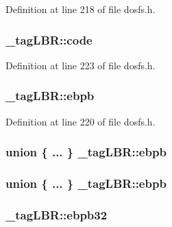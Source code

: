 Definition at line 218 of file dosfs.\-h.

\hypertarget{struct__tag_l_b_r_a9b37ce11cb14157ded631ff935d17c94}{
\subsubsection[{code}]{ \-\_\-tag\-L\-B\-R\-::code}}\label{struct__tag_l_b_r_a9b37ce11cb14157ded631ff935d17c94}


Definition at line 223 of file dosfs.\-h.

\hypertarget{struct__tag_l_b_r_a86d3372f818b659d2031640876756593}{
\subsubsection[{ebpb}]{ \-\_\-tag\-L\-B\-R\-::ebpb}}\label{struct__tag_l_b_r_a86d3372f818b659d2031640876756593}


Definition at line 220 of file dosfs.\-h.

\hypertarget{struct__tag_l_b_r_a36f500a686f857a8207e41763a4021c9}{
\subsubsection[{ebpb}]{\setlength{\rightskip}{0pt plus 5cm}union \{ ... \}   \-\_\-tag\-L\-B\-R\-::ebpb}}\label{struct__tag_l_b_r_a36f500a686f857a8207e41763a4021c9}
\hypertarget{struct__tag_l_b_r_a75f624210b6728a97ed21dcac0dfb4fd}{
\subsubsection[{ebpb}]{\setlength{\rightskip}{0pt plus 5cm}union \{ ... \}   \-\_\-tag\-L\-B\-R\-::ebpb}}\label{struct__tag_l_b_r_a75f624210b6728a97ed21dcac0dfb4fd}
\hypertarget{struct__tag_l_b_r_a2998f055db7d2eb2020271037630d3d3}{
\subsubsection[{ebpb32}]{ \-\_\-tag\-L\-B\-R\-::ebpb32}}\label{struct__tag_l_b_r_a2998f055db7d2eb2020271037630d3d3}


